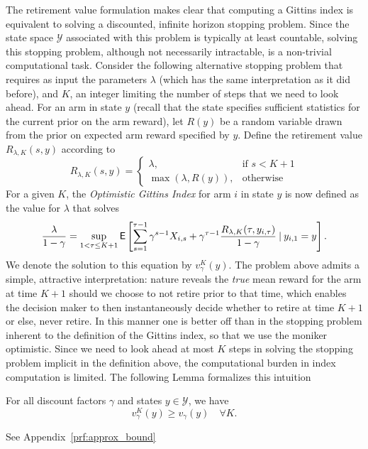 The retirement value formulation makes clear that computing a Gittins index is equivalent to solving a discounted, infinite horizon stopping problem. Since the state space $\mathcal Y$ associated with this problem is typically at least countable, solving this stopping problem, although not necessarily intractable, is a non-trivial computational task. Consider the following alternative stopping problem that requires as input the parameters $\lambda$ (which has the same interpretation as it did before), and $K$, an integer limiting the number of steps that we need to look ahead. For an arm in state $y$ (recall that the state specifies sufficient statistics for the current prior on the arm reward), let $R(y)$ be a random variable drawn from the prior on expected arm reward specified by $y$. Define the retirement value $R_{\lambda,K}(s,y)$ according to 
\[
R_{\lambda,K}(s, y) = 
\begin{cases}
\lambda ,& \text{if } s < K+1\\
\max\left(\lambda, R(y) \right), & \text{otherwise}
\end{cases}
\]
For a given $K$, the \emph{Optimistic Gittins Index} for arm $i$ in state $y$ is now defined as the value for $\lambda$ that solves
\begin{equation} \label{eqn:ogi_general}
\frac{ \lambda}{1-\gamma} = \sup_{1 < \tau \leq K+1}
\mathsf{E}\left[
	\sum_{s=1}^{\tau-1} \gamma^{s-1}X_{i,s} + \gamma^{\tau-1} \frac{R_{\lambda,K}(\tau, y_{i,\tau})}{1-\gamma}
	\:\vert\:
	y_{i,1}=y
\right].
\end{equation}
We denote the solution to this equation by $v_\gamma^{K}(y)$.
The problem above admits a simple, attractive interpretation: nature reveals the {\em true} mean reward for the arm at time $K+1$ should we choose to not retire prior to that time, which enables the decision maker to then instantaneously decide whether to retire at time $K+1$ or else, never retire. In this manner one is better off than in the stopping problem inherent to the definition of the Gittins index, so that we use the moniker optimistic. Since we need to look ahead at most $K$ steps in solving the stopping problem implicit in the definition above, the computational burden in index computation is limited. The following Lemma formalizes this intuition

\begin{lemma} \label{lemma:approx_bound}
	For all discount factors $\gamma$ and states $y \in \mathcal Y$, we have 
	\[
	v_\gamma^{K}(y) \geq v_\gamma(y) \quad \forall K.
	\]
\end{lemma}
\begin{myproof}[Proof]
	See Appendix~\ref{prf:approx_bound}%
\end{myproof}

